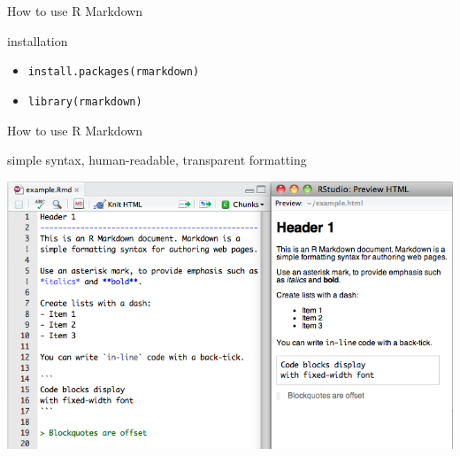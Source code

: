 \documentclass[ignorenonframetext,]{beamer}
\begin{document}
\begin{frame}{How to use R Markdown}

\begin{block}{installation}

\begin{itemize}[<+->]
\itemsep1pt\parskip0pt
\item
  \texttt{install.packages(\textquotesingle{}rmarkdown\textquotesingle{})}
\item
  \texttt{library(rmarkdown)}
\end{itemize}

\end{block}

\end{frame}

\begin{frame}{How to use R Markdown}

\begin{block}{simple syntax, human-readable, transparent formatting}

\includegraphics{images/markdownOverview.png}

\end{block}

\end{frame}
\end{document}
